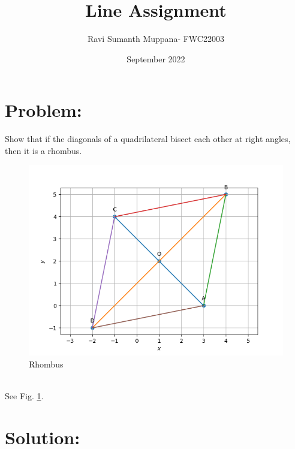 \documentclass[a4paper,12pt,twocolumn]{article}
\title{Line Assignment}
\author{Ravi Sumanth Muppana- FWC22003}
\date{September 2022}
\begin{document}
\maketitle
\section{Problem:}
\fi
Show that if the diagonals of a quadrilateral bisect each other at right angles, then it is a rhombus.
\begin{figure}[!h]
	\centering
	\includegraphics[width=\columnwidth]{chapters/9/8/1/3/figs/rhombus.png}
	\caption{Rhombus}
	\label{fig:9/8/1/3}
\end{figure}
\\
\solution See Fig. 
	\ref{fig:9/8/1/3}.
\iffalse
\maketitle
\section{Solution:}
\end{document}
